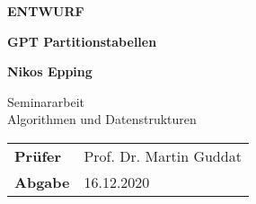 \begin{titlepage}
    \begin{center}
        \vspace*{1cm}

        \small {\textbf{ENTWURF}}
            
        \Huge
        \textbf{GPT Partitionstabellen}
            
        \vspace{1cm}
            
        \Large
        \textbf{Nikos Epping}
            
   		\vspace{0.8cm}
            
        Seminararbeit \\
        \large Algorithmen und Datenstrukturen

        \vspace{2cm}

        \begin{center}
        \begin{tabular}{ p{2.5cm} l }
            \textbf{Prüfer} & Prof. Dr. Martin Guddat \\
            \textbf{Abgabe} & 16.12.2020
            \end{tabular}
        \end{center}

        \vfill
            
        
            
    \end{center}
\end{titlepage}
